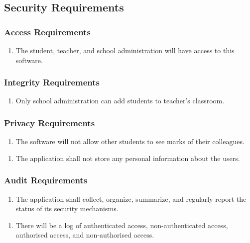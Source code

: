 \documentclass[]{article}
\begin{document}
\subsection{Security Requirements}
\label{sub:security_requirements}

\subsubsection{Access Requirements}
\label{ssub:access_requirements}
\begin{enumerate}[{SR}1. ]
	\item The student, teacher, and school administration will have access to this
software.
\end{enumerate}

\subsubsection{Integrity Requirements}
\label{ssub:integrity_requirements}
\begin{enumerate}[{SR}1. ]
	\item Only school administration can add students
	to teacher's classroom.
\end{enumerate}

\subsubsection{Privacy Requirements}
\label{ssub:privacy_requirements}
\begin{enumerate}[{SR}1. ]
	\item The software will not allow other students to see marks of their
colleagues.
\end{enumerate}
\begin{enumerate}[{SR}2. ]
	\item The application shall not store any personal information about the users.
\end{enumerate}

\subsubsection{Audit Requirements}
\label{ssub:audit_requirements}
\begin{enumerate}[{SR}1. ]
	\item The application shall collect, organize, summarize, and regularly report
the status of its security mechanisms.
\end{enumerate}
\begin{enumerate}[{SR}2. ]
	\item There will be a log of authenticated access, non-authenticated access,
authorised access, and non-authorised access.
\end{enumerate}
\end{document}
